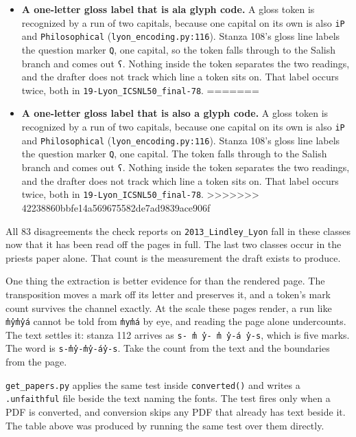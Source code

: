 \begin{itemize}
<<<<<<< HEAD
\item \textbf{A one-letter gloss label that is ala glyph code.} A gloss token is recognized by a run of two capitals, because one capital on its own is also \texttt{i\allowbreak{}P} and \texttt{Philosophical} (\texttt{lyon\_\allowbreak{}encoding.\allowbreak{}py:116}). Stanza 108's gloss line labels the question marker \texttt{Q}, one capital, so the token falls through to the Salish branch and comes out \texttt{ʕ}. Nothing inside the token separates the two readings, and the drafter does not track which line a token sits on. That label occurs twice, both in \texttt{19-\allowbreak{}Lyon\_\allowbreak{}ICSNL50\_\allowbreak{}final-\allowbreak{}78}.
=======
\item \textbf{A one-letter gloss label that is also a glyph code.} A gloss token is recognized by a run of two capitals, because one capital on its own is also \texttt{i\allowbreak{}P} and \texttt{Philosophical} (\texttt{lyon\_\allowbreak{}encoding.\allowbreak{}py:116}). Stanza 108's gloss line labels the question marker \texttt{Q}, one capital. The token falls through to the Salish branch and comes out \texttt{ʕ}. Nothing inside the token separates the two readings, and the drafter does not track which line a token sits on. That label occurs twice, both in \texttt{19-\allowbreak{}Lyon\_\allowbreak{}ICSNL50\_\allowbreak{}final-\allowbreak{}78}.
>>>>>>> 42238860bbfe14a569675582de7ad9839ace906f
\end{itemize}

All 83 disagreements the check reports on \texttt{2013\_\allowbreak{}Lindley\_\allowbreak{}Lyon} fall in these classes now that it has been read off the pages in full. The last two classes occur in the priests paper alone. That count is the measurement the draft exists to produce.

One thing the extraction is better evidence for than the rendered page. The transposition moves a mark off its letter and preserves it, and a token's mark count survives the channel exactly. At the scale these pages render, a run like \texttt{m̓y̓m̓y̓á} cannot be told from \texttt{m̓ym̓á} by eye, and reading the page alone undercounts. The text settles it: stanza 112 arrives as \texttt{s-\allowbreak{} m̓ y̓-\allowbreak{} m̓ y̓-\allowbreak{}á y̓-\allowbreak{}s}, which is five marks. The word is \texttt{s-\allowbreak{}m̓y̓-\allowbreak{}m̓y̓-\allowbreak{}áy̓-\allowbreak{}s}. Take the count from the text and the boundaries from the page.

\texttt{get\_\allowbreak{}papers.\allowbreak{}py} applies the same test inside \texttt{converted()} and writes a \texttt{.\allowbreak{}unfaithful} file beside the text naming the fonts. The test fires only when a PDF is converted, and conversion skips any PDF that already has text beside it. The table above was produced by running the same test over them directly.

